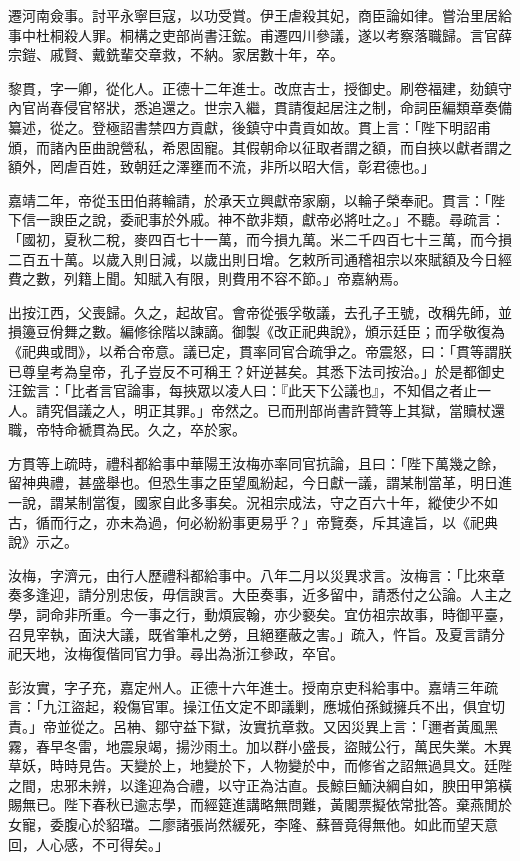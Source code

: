 \begin{pinyinscope}
遷河南僉事。討平永寧巨寇，以功受賞。伊王虐殺其妃，商臣論如律。嘗治里居給事中杜桐殺人罪。桐構之吏部尚書汪鋐。甫遷四川參議，遂以考察落職歸。言官薛宗鎧、戚賢、戴銑輩交章救，不納。家居數十年，卒。

黎貫，字一卿，從化人。正德十二年進士。改庶吉士，授御史。刷卷福建，劾鎮守內官尚春侵官帑狀，悉追還之。世宗入繼，貫請復起居注之制，命詞臣編類章奏備纂述，從之。登極詔書禁四方貢獻，後鎮守中貴貢如故。貫上言：「陛下明詔甫頒，而諸內臣曲說營私，希恩固寵。其假朝命以征取者謂之額，而自挾以獻者謂之額外，罔虐百姓，致朝廷之澤壅而不流，非所以昭大信，彰君德也。」

嘉靖二年，帝從玉田伯蔣輪請，於承天立興獻帝家廟，以輪子榮奉祀。貫言：「陛下信一諛臣之說，委祀事於外戚。神不歆非類，獻帝必將吐之。」不聽。尋疏言：「國初，夏秋二稅，麥四百七十一萬，而今損九萬。米二千四百七十三萬，而今損二百五十萬。以歲入則日減，以歲出則日增。乞敕所司通稽祖宗以來賦額及今日經費之數，列籍上聞。知賦入有限，則費用不容不節。」帝嘉納焉。

出按江西，父喪歸。久之，起故官。會帝從張孚敬議，去孔子王號，改稱先師，並損籩豆佾舞之數。編修徐階以諫謫。御製《改正祀典說》，頒示廷臣；而孚敬復為《祀典或問》，以希合帝意。議已定，貫率同官合疏爭之。帝震怒，曰：「貫等謂朕已尊皇考為皇帝，孔子豈反不可稱王？奸逆甚矣。其悉下法司按治。」於是都御史汪鋐言：「比者言官論事，每挾眾以凌人曰：『此天下公議也』，不知倡之者止一人。請究倡議之人，明正其罪。」帝然之。已而刑部尚書許贊等上其獄，當贖杖還職，帝特命褫貫為民。久之，卒於家。

方貫等上疏時，禮科都給事中華陽王汝梅亦率同官抗論，且曰：「陛下萬幾之餘，留神典禮，甚盛舉也。但恐生事之臣望風紛起，今日獻一議，謂某制當革，明日進一說，謂某制當復，國家自此多事矣。況祖宗成法，守之百六十年，縱使少不如古，循而行之，亦未為過，何必紛紛事更易乎？」帝覽奏，斥其違旨，以《祀典說》示之。

汝梅，字濟元，由行人歷禮科都給事中。八年二月以災異求言。汝梅言：「比來章奏多逢迎，請分別忠佞，毋信諛言。大臣奏事，近多留中，請悉付之公論。人主之學，詞命非所重。今一事之行，動煩宸翰，亦少褻矣。宜仿祖宗故事，時御平臺，召見宰執，面決大議，既省筆札之勞，且絕壅蔽之害。」疏入，忤旨。及夏言請分祀天地，汝梅復偕同官力爭。尋出為浙江參政，卒官。

彭汝實，字子充，嘉定州人。正德十六年進士。授南京吏科給事中。嘉靖三年疏言：「九江盜起，殺傷官軍。操江伍文定不即議剿，應城伯孫鉞擁兵不出，俱宜切責。」帝並從之。呂柟、鄒守益下獄，汝實抗章救。又因災異上言：「邇者黃風黑霧，春早冬雷，地震泉竭，揚沙雨土。加以群小盛長，盜賊公行，萬民失業。木異草妖，時時見告。天變於上，地變於下，人物變於中，而修省之詔無過具文。廷陛之間，忠邪未辨，以逢迎為合禮，以守正為沽直。長鯨巨鮞決綱自如，腴田甲第橫賜無已。陛下春秋已逾志學，而經筵進講略無問難，黃閣票擬依常批答。棄燕閒於女寵，委腹心於貂璫。二廖諸張尚然緩死，李隆、蘇晉竟得無他。如此而望天意回，人心感，不可得矣。」


\end{pinyinscope}
